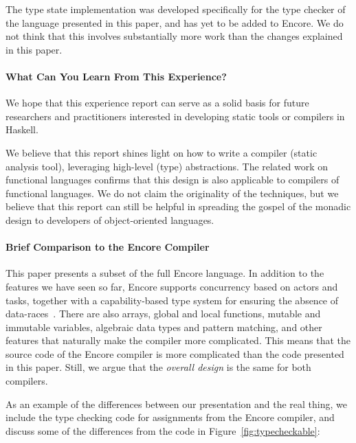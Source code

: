 \documentclass[sigplan,screen]{acmart}
\begin{document}
The type state implementation was developed specifically for
the type checker of the language presented in this paper, and has yet
to be added to Encore. We do not think that this involves
substantially more work than the changes explained in this paper.

\paragraph{What Can You Learn From This Experience?}

We hope that this experience report can serve as a solid basis
for future researchers and practitioners
interested in developing static tools or compilers in Haskell.

We believe that this report shines light on how to write a compiler (static analysis tool),
leveraging high-level (type) abstractions. The related work on functional languages
confirms that this design is also applicable to compilers of functional languages.
We do not claim the originality of the techniques,
but we believe that this report can still be helpful in spreading the gospel of
the monadic design to developers of object-oriented languages.

\paragraph{Brief Comparison to the Encore Compiler}

This paper pre\-sents a subset of the full Encore language. In
addition to the features we have seen so far, Encore supports
concurrency based on actors and tasks, together with a
capability-based type system for ensuring the absence of
data-races~\cite{Kappa}. There are also arrays, global and local
functions, mutable and immutable variables, algebraic data types
and pattern matching, and other features that naturally make the
compiler more complicated. This means that the source code of the
Encore compiler is more complicated than the code presented in
this paper. Still, we argue that the \emph{overall design} is the
same for both compilers.

As an example of the differences between our presentation and the
real thing, we include the type checking code for assignments from
the Encore compiler, and discuss some of the differences from the
code in Figure~\ref{fig:typecheckable}:
\end{document}
